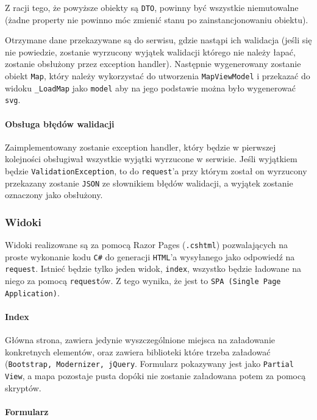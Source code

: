\documentclass[a4paper, 10pt, titlepage]{article}
\newcommand{\code}[1]{\texttt{#1}}
\begin{document}
Z racji tego, że powyższe obiekty są \code{DTO}, powinny być wszystkie niemutowalne (żadne property nie powinno móc zmienić stanu po zainstancjonowaniu obiektu).

Otrzymane dane przekazywane są do serwisu, gdzie nastąpi ich walidacja (jeśli się nie powiedzie, zostanie wyrzucony wyjątek walidacji którego nie należy łapać, zostanie obsłużony przez exception handler).
Następnie wygenerowany zostanie obiekt \code{Map}, który należy wykorzystać do utworzenia \code{MapViewModel} i przekazać do widoku \code{\_LoadMap} jako \code{model} aby na jego podstawie można było wygenerować \code{svg}.

\paragraph{Obsługa błędów walidacji}

Zaimplementowany zostanie exception handler, który będzie w pierwszej kolejności obsługiwał wszystkie wyjątki wyrzucone w serwisie. Jeśli wyjątkiem będzie \code{ValidationException}, to do \code{request}'a przy którym został on wyrzucony przekazany zostanie \code{JSON} ze słownikiem błędów walidacji, a wyjątek zostanie oznaczony jako obsłużony.

\subsubsection{Widoki}

Widoki realizowane są za pomocą Razor Pages (\code{.cshtml}) pozwalających na proste wykonanie kodu \code{C\#} do generacji \code{HTML}'a wysyłanego jako odpowiedź na \code{request}.
Istnieć będzie tylko jeden widok, \code{index}, wszystko będzie ładowane na niego za pomocą \code{request}ów.
Z tego wynika, że jest to \code{SPA (Single Page Application)}.

\paragraph{Index}

Główna strona, zawiera jedynie wyszczególnione miejsca na załadowanie konkretnych elementów, oraz zawiera biblioteki które trzeba załadować (\code{Bootstrap, Modernizer, jQuery}.
Formularz pokazywany jest jako \code{Partial View}, a mapa pozostaje pusta dopóki nie zostanie załadowana potem za pomocą skryptów.

\paragraph{Formularz}
\end{document}
